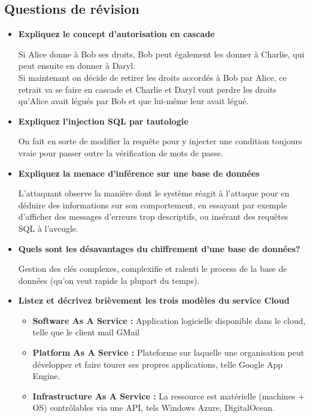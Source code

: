 \documentclass{report}
\begin{document}
		\subsection{Questions de révision}

			\begin{itemize}
				\item \textbf{Expliquez le concept d'autorisation en cascade}

					Si Alice donne à Bob ses droits, Bob peut également les donner à Charlie, qui peut ensuite en donner à Daryl.\\
					Si maintenant on décide de retirer les droits accordés à Bob par Alice, ce retrait va se faire en cascade et Charlie et Daryl vont perdre les droits qu'Alice avait légués par Bob et que lui-même leur avait légué.\\

				\item \textbf{Expliquez l'injection SQL par tautologie}

					On fait en sorte de modifier la requête pour y injecter une condition toujours vraie pour passer outre la vérification de mots de passe.\\

				\item \textbf{Expliquez la menace d'inférence sur une base de données}

					L'attaquant observe la manière dont le système réagit à l'attaque pour en déduire des informations sur son comportement, en essayant par exemple d'afficher des messages d'erreurs trop descriptifs, ou insérant des requêtes SQL à l'aveugle.\\

				\item \textbf{Quels sont les désavantages du chiffrement d'une base de données?}

					Gestion des clés complexes, complexifie et ralenti le process de la base de données (qu'on veut rapide la plupart du temps).

				\item \textbf{Listez et décrivez brièvement les trois modèles du service Cloud}

					\begin{itemize}
						\item \textbf{Software As A Service : } Application logicielle disponible dans le cloud, telle que le client mail GMail
						\item \textbf{Platform As A Service : } Plateforme sur laquelle une organisation peut développer et faire tourer ses propres applications, telle Google App Engine.
						\item \textbf{Infrastructure As A Service : } La ressource est matérielle (machines + OS) contrôlables via une API, tels Windows Azure, DigitalOcean.\\
					\end{itemize}


\end{itemize}
\end{document}
